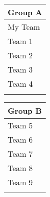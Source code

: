 \centering
\LARGE{
\setlength{\tabcolsep}{1em}
\begin{tabular}{|l|}
\hline
\textbf{Group A}\\
\hline
My Team\\
Team 1\\
Team 2\\
Team 3\\
Team 4\\
\hline
\multicolumn{1}{c}{}\\
\end{tabular}
\hspace{2em}
\begin{tabular}{|l|}
\hline
\textbf{Group B}\\
\hline
Team 5\\
Team 6\\
Team 7\\
Team 8\\
Team 9\\
\hline
\multicolumn{1}{c}{}\\
\end{tabular}
}
